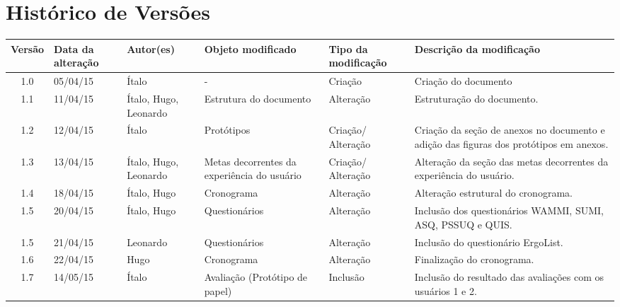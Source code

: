 \chapter{Histórico de Versões}

\begin{table}[h]
  \centering
  \begin{tabular}{|c|m{2cm}|m{2.8cm}|m{2.3cm}|m{2.44cm}|m{4.2cm}|}

  \hline
  \textbf{Versão} & \textbf{Data da alteração} & \textbf{Autor(es)} & \textbf{Objeto modificado} & \textbf{Tipo da modificação} & \textbf{Descrição da modificação}\\
  
  \hline                               
  1.0 & 05/04/15 & Ítalo & - & Criação & Criação do documento\\
  
  \hline                               
  1.1 & 11/04/15 & Ítalo, Hugo, Leonardo & Estrutura do documento & Alteração & Estruturação do documento.\\
  
  \hline                               
  1.2 & 12/04/15 & Ítalo & Protótipos & Criação/ Alteração & Criação da seção de anexos no documento e adição das figuras dos protótipos em anexos.\\
 
  \hline                               
  1.3 & 13/04/15 & Ítalo, Hugo, Leonardo & Metas decorrentes da experiência do usuário & Criação/ Alteração & Alteração da seção das metas decorrentes da experiência do usuário.\\
 
  \hline                               
  1.4 & 18/04/15 & Ítalo, Hugo & Cronograma & Alteração & Alteração estrutural do cronograma.\\
 
  \hline                               
  1.5 & 20/04/15 & Ítalo, Hugo & Questionários & Alteração & Inclusão dos questionários WAMMI, SUMI, ASQ, PSSUQ e QUIS.\\
 
  \hline                               
  1.5 & 21/04/15 & Leonardo & Questionários & Alteração & Inclusão do questionário ErgoList.\\
 
  \hline                               
  1.6 & 22/04/15 & Hugo & Cronograma & Alteração & Finalização do cronograma.\\
  
  \hline                               
  1.7 & 14/05/15 & Ítalo & Avaliação (Protótipo de papel) & Inclusão & Inclusão do resultado das avaliações com os usuários 1 e 2.\\
  

\end{tabular}
\end{table}
